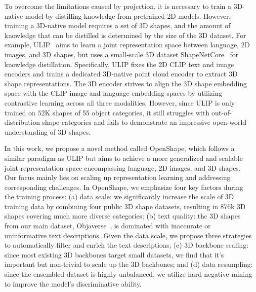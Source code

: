 To overcome the limitations caused by projection, it is necessary to train a 3D-native model by distilling knowledge from pretrained 2D models. However, training a 3D-native model requires a set of 3D shapes, and the amount of knowledge that can be distilled is determined by the size of the 3D dataset. For example, ULIP~\cite{xue2022ulip} aims to learn a joint representation space between language, 2D images, and 3D shapes, but uses a small-scale 3D dataset ShapeNetCore~\cite{chang2015shapenet} for knowledge distillation. Specifically, ULIP fixes the 2D CLIP text and image encoders and trains a dedicated 3D-native point cloud encoder to extract 3D shape representations. The 3D encoder strives to align the 3D shape embedding space with the CLIP image and language embedding spaces by utilizing contrastive learning across all three modalities. However, since ULIP is only trained on 52K shapes of 55 object categories, it still struggles with out-of-distribution shape categories and fails to demonstrate an impressive open-world understanding of 3D shapes. 

In this work, we propose a novel method called OpenShape, which follows a similar paradigm as ULIP but aims to achieve a more generalized and scalable joint representation space encompassing language, 2D images, and 3D shapes. Our focus mainly lies on scaling up representation learning and addressing corresponding challenges. In OpenShape, we emphasize four key factors during the training process: (a) data scale: we significantly increase the scale of 3D training data by combining four public 3D shape datasets, resulting in 876k 3D shapes covering much more diverse categories; (b) text quality: the 3D shapes from our main dataset, Objaverse~\cite{objaverse}, is dominated with inaccurate or uninformative text descriptions. Given the data scale, we propose three strategies to automatically filter and enrich the text descriptions; (c) 3D backbone scaling: since most existing 3D backbones target small datasets, we find that it's important but non-trivial to scale up the 3D backbones; and (d) data resampling: since the ensembled dataset is highly unbalanced, we utilize hard negative mining to improve the model's discriminative ability.

